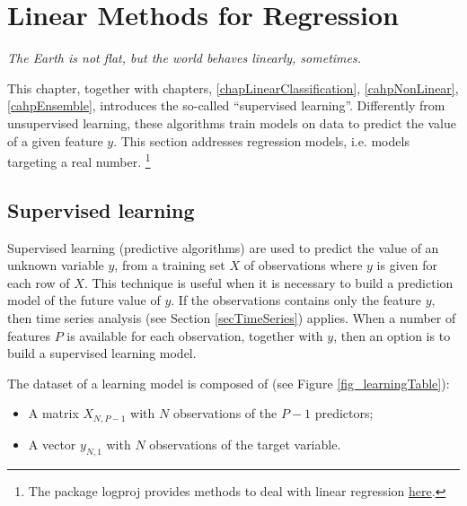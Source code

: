 \chapter{Linear Methods for Regression}{} \label{chapLinearRegression}

\epigraph{\textit{The Earth is not flat, but the world behaves linearly, sometimes.}}{}

This chapter, together with chapters, \ref{chapLinearClassification}, \ref{cahpNonLinear}, \ref{cahpEnsemble}, introduces the so-called “supervised learning”. Differently from unsupervised learning, these algorithms train models on data to predict the value of a given feature $y$. This section addresses regression models, i.e. models targeting a real number. \footnote{The package logproj provides methods to deal with linear regression \href{https://github.com/aletuf93/logproj/blob/master/logproj/M_learningMethod/linear_models.py}{here}.} 

\section{Supervised learning} \label{supervisedLearning}
Supervised learning (predictive algorithms) are used to predict the value of an unknown variable $y$, from a training set $X$ of observations where $y$ is given for each row of $X$. This technique is useful when it is necessary to build a prediction model of the future value of $y$. If the observations contains only the feature $y$, then time series analysis (see Section \ref{secTimeSeries}) applies. When a number of features $P$ is available for each observation, together with $y$, then an option is to build a supervised learning model.

The dataset of a learning model is composed of (see Figure \ref{fig_learningTable}):
\begin{itemize}
    \item A matrix $X_{N,P-1}$ with $N$ observations of the $P-1$ predictors;
    \item A vector $y_{N,1}$ with $N$ observations of the target variable.
\end{itemize}

